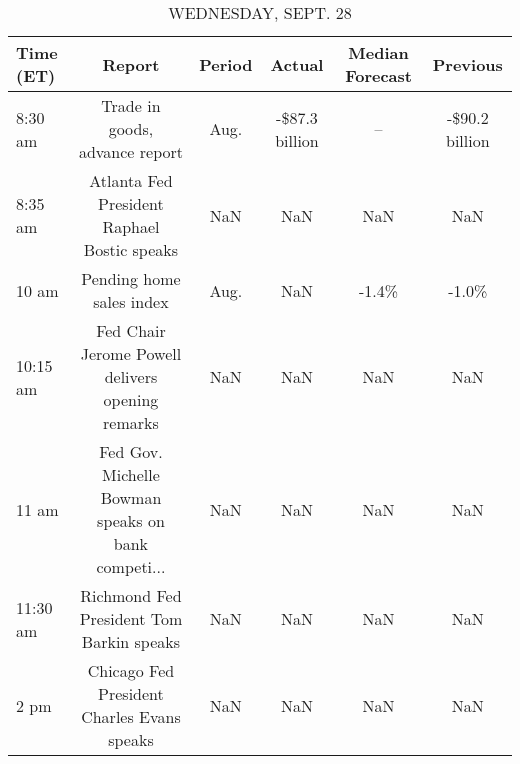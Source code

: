 \documentclass{article}%
\begin{document}
\begin{table}[htbp]%
\caption{WEDNESDAY, SEPT. 28}%
\centering%
\begin{adjustbox}{width=1\textwidth}%
\begin{tabular}{lccccc}
\toprule
Time (ET) &                                             Report & Period &         Actual & Median Forecast &       Previous \\
\midrule
  8:30 am &                     Trade in goods, advance report &   Aug. & -\$87.3 billion &              -- & -\$90.2 billion \\
  8:35 am &        Atlanta Fed President Raphael Bostic speaks &    NaN &            NaN &             NaN &            NaN \\
    10 am &                           Pending home sales index &   Aug. &            NaN &           -1.4\% &          -1.0\% \\
 10:15 am &   Fed Chair Jerome Powell delivers opening remarks &    NaN &            NaN &             NaN &            NaN \\
    11 am & Fed Gov. Michelle Bowman speaks on bank competi... &    NaN &            NaN &             NaN &            NaN \\
 11:30 am &           Richmond Fed President Tom Barkin speaks &    NaN &            NaN &             NaN &            NaN \\
     2 pm &         Chicago Fed President Charles Evans speaks &    NaN &            NaN &             NaN &            NaN \\
\bottomrule
\end{tabular}
%
\end{adjustbox}%
\end{table}

%
\end{document}
